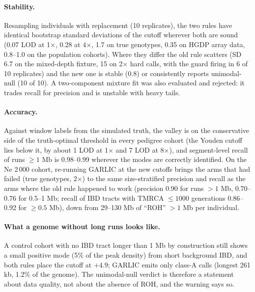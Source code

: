 \documentclass[11pt]{article}
\begin{document}
\paragraph{Stability.} Resampling individuals with replacement (10 replicates), the two rules have identical bootstrap standard deviations of the cutoff wherever both are sound (0.07 LOD at 1$\times$, 0.28 at 4$\times$, 1.7 on true genotypes, 0.35 on HGDP array data, 0.8--1.0 on the population cohorts). Where they differ the old rule scatters (SD 6.7 on the mixed-depth fixture, 15 on 2$\times$ hard calls, with the guard firing in 6 of 10 replicates) and the new one is stable (0.8) or consistently reports unimodal-null (10 of 10). A two-component mixture fit was also evaluated and rejected: it trades recall for precision and is unstable with heavy tails.

\paragraph{Accuracy.} Against window labels from the simulated truth, the valley is on the conservative side of the truth-optimal threshold in every pedigree cohort (the Youden cutoff lies below it, by about 1 LOD at 1$\times$ and 7 LOD at 8$\times$), and segment-level recall of runs $\ge1$ Mb is 0.98--0.99 wherever the modes are correctly identified. On the Ne 2\,000 cohort, re-running GARLIC at the new cutoffs brings the arms that had failed (true genotypes, 2$\times$) to the same size-stratified precision and recall as the arms where the old rule happened to work (precision 0.90 for runs $>1$ Mb, 0.70--0.76 for 0.5--1 Mb; recall of IBD tracts with TMRCA $\le 1000$ generations 0.86--0.92 for $\ge 0.5$ Mb), down from 29--130 Mb of ``ROH'' $>1$ Mb per individual.

\paragraph{What a genome without long runs looks like.} A control cohort with no IBD tract longer than 1 Mb by construction still shows a small positive mode (5\% of the peak density) from short background IBD, and both rules place the cutoff at $+4.9$; GARLIC emits only class-A calls (longest 261 kb, 1.2\% of the genome). The unimodal-null verdict is therefore a statement about data quality, not about the absence of ROH, and the warning says so.
\end{document}
